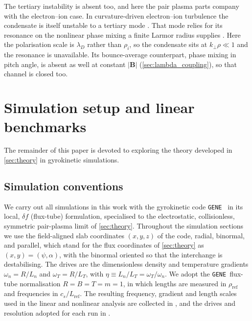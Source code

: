 \documentclass{jpp}
\newcommand{\bB}{\mathbf{B}}
\newcommand{\kperp}{k_\perp}
\newcommand{\lambdaD}{\lambda_D}
\newcommand{\gene}{\texttt{GENE}}
\begin{document}
The tertiary instability is absent too, and here the pair plasma parts company with the electron--ion case. In curvature-driven electron--ion turbulence the condensate is itself unstable to a tertiary mode \citep{Ivanov2020, Hallenbert_Plunk_2021}. That mode relies for its resonance on the nonlinear phase mixing a finite Larmor radius supplies \citep{Rogers2000}. Here the polarisation scale is $\lambdaD$ rather than $\rho_i$, so the condensate sits at $\kperp\rho \ll 1$ and the resonance is unavailable. Its bounce-average counterpart, phase mixing in pitch angle, is absent as well at constant $|\bB|$ (\cref{sec:lambda_coupling}), so that channel is closed too.

\section{Simulation setup and linear benchmarks}\label{sec:setup}
The remainder of this paper is devoted to exploring the theory developed in \cref{sec:theory} in gyrokinetic simulations. 

\subsection{Simulation conventions}

We carry out all simulations in this work with the gyrokinetic code \gene\ \citep{Jenko2000} in its local, $\delta\! f$ (flux-tube) formulation, specialised to the electrostatic, collisionless, symmetric pair-plasma limit of \cref{sec:theory}. Throughout the simulation sections we use the field-aligned slab coordinates $(x, y, z)$ of the code, radial, binormal, and parallel, which stand for the flux coordinates of \cref{sec:theory} as $(x, y) = (\psi, \alpha)$, with the binormal oriented so that the interchange is destabilising. The drives are the dimensionless density and temperature gradients $\omega_n = R/L_n$ and $\omega_T = R/L_T$, with $\eta \equiv L_n/L_T = \omega_T/\omega_n$.  We adopt the \gene\ flux-tube normalisation $R = B = T = m = 1$, in which lengths are measured in $\rho_\mathrm{ref}$ and frequencies in $c_s/L_\mathrm{ref}$. The resulting frequency, gradient and length scales used in the linear and nonlinear analysis are collected in , and the drives and resolution adopted for each run in .
\end{document}
